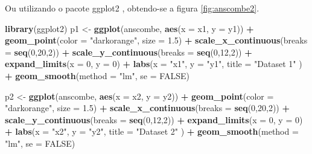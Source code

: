 \documentclass[
	12pt,				%
	oneside,			%
	a4paper,			%
	chapter=TITLE,		%
	section=TITLE,		%
	english,			%
	brazil				%
	]{abntex2}
\newcommand{\pkg}[1]{{\normalfont\fontseries{b}\selectfont #1}}
\newenvironment{Shaded}{\begin{snugshade}}{\end{snugshade}}
\newcommand{\AttributeTok}[1]{\textcolor[rgb]{0.13,0.29,0.53}{#1}}
\newcommand{\ConstantTok}[1]{\textcolor[rgb]{0.56,0.35,0.01}{#1}}
\newcommand{\DecValTok}[1]{\textcolor[rgb]{0.00,0.00,0.81}{#1}}
\newcommand{\FloatTok}[1]{\textcolor[rgb]{0.00,0.00,0.81}{#1}}
\newcommand{\FunctionTok}[1]{\textcolor[rgb]{0.13,0.29,0.53}{\textbf{#1}}}
\newcommand{\NormalTok}[1]{#1}
\newcommand{\OtherTok}[1]{\textcolor[rgb]{0.56,0.35,0.01}{#1}}
\newcommand{\SpecialCharTok}[1]{\textcolor[rgb]{0.81,0.36,0.00}{\textbf{#1}}}
\newcommand{\StringTok}[1]{\textcolor[rgb]{0.31,0.60,0.02}{#1}}
\begin{document}
Ou utilizando o pacote \pkg{ggplot2} \autocite*{R-ggplot2}, obtendo-se a figura \ref{fig:anscombe2}.
\begin{Shaded}
\begin{Highlighting}[]
\FunctionTok{library}\NormalTok{(ggplot2)}
\NormalTok{p1 }\OtherTok{\textless{}{-}} \FunctionTok{ggplot}\NormalTok{(anscombe, }\FunctionTok{aes}\NormalTok{(}\AttributeTok{x =}\NormalTok{ x1, }\AttributeTok{y =}\NormalTok{ y1)) }\SpecialCharTok{+}
  \FunctionTok{geom\_point}\NormalTok{(}\AttributeTok{color =} \StringTok{"darkorange"}\NormalTok{, }\AttributeTok{size =} \FloatTok{1.5}\NormalTok{) }\SpecialCharTok{+}
  \FunctionTok{scale\_x\_continuous}\NormalTok{(}\AttributeTok{breaks =} \FunctionTok{seq}\NormalTok{(}\DecValTok{0}\NormalTok{,}\DecValTok{20}\NormalTok{,}\DecValTok{2}\NormalTok{)) }\SpecialCharTok{+}
  \FunctionTok{scale\_y\_continuous}\NormalTok{(}\AttributeTok{breaks =} \FunctionTok{seq}\NormalTok{(}\DecValTok{0}\NormalTok{,}\DecValTok{12}\NormalTok{,}\DecValTok{2}\NormalTok{)) }\SpecialCharTok{+}
  \FunctionTok{expand\_limits}\NormalTok{(}\AttributeTok{x =} \DecValTok{0}\NormalTok{, }\AttributeTok{y =} \DecValTok{0}\NormalTok{) }\SpecialCharTok{+}
  \FunctionTok{labs}\NormalTok{(}\AttributeTok{x =} \StringTok{"x1"}\NormalTok{, }\AttributeTok{y =} \StringTok{"y1"}\NormalTok{,}
       \AttributeTok{title =} \StringTok{"Dataset 1"}\NormalTok{ ) }\SpecialCharTok{+}
  \FunctionTok{geom\_smooth}\NormalTok{(}\AttributeTok{method =} \StringTok{"lm"}\NormalTok{, }\AttributeTok{se =} \ConstantTok{FALSE}\NormalTok{)}

\NormalTok{p2 }\OtherTok{\textless{}{-}} \FunctionTok{ggplot}\NormalTok{(anscombe, }\FunctionTok{aes}\NormalTok{(}\AttributeTok{x =}\NormalTok{ x2, }\AttributeTok{y =}\NormalTok{ y2)) }\SpecialCharTok{+}
  \FunctionTok{geom\_point}\NormalTok{(}\AttributeTok{color =} \StringTok{"darkorange"}\NormalTok{, }\AttributeTok{size =} \FloatTok{1.5}\NormalTok{) }\SpecialCharTok{+}
  \FunctionTok{scale\_x\_continuous}\NormalTok{(}\AttributeTok{breaks =} \FunctionTok{seq}\NormalTok{(}\DecValTok{0}\NormalTok{,}\DecValTok{20}\NormalTok{,}\DecValTok{2}\NormalTok{)) }\SpecialCharTok{+}
  \FunctionTok{scale\_y\_continuous}\NormalTok{(}\AttributeTok{breaks =} \FunctionTok{seq}\NormalTok{(}\DecValTok{0}\NormalTok{,}\DecValTok{12}\NormalTok{,}\DecValTok{2}\NormalTok{)) }\SpecialCharTok{+}
  \FunctionTok{expand\_limits}\NormalTok{(}\AttributeTok{x =} \DecValTok{0}\NormalTok{, }\AttributeTok{y =} \DecValTok{0}\NormalTok{) }\SpecialCharTok{+}
  \FunctionTok{labs}\NormalTok{(}\AttributeTok{x =} \StringTok{"x2"}\NormalTok{, }\AttributeTok{y =} \StringTok{"y2"}\NormalTok{,}
       \AttributeTok{title =} \StringTok{"Dataset 2"}\NormalTok{ ) }\SpecialCharTok{+}
  \FunctionTok{geom\_smooth}\NormalTok{(}\AttributeTok{method =} \StringTok{"lm"}\NormalTok{, }\AttributeTok{se =} \ConstantTok{FALSE}\NormalTok{)}


\end{Highlighting}
\end{Shaded}
\end{document}
